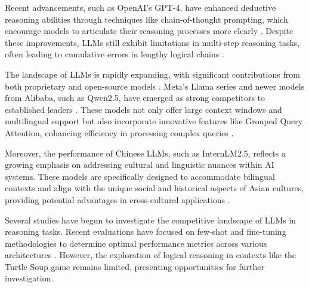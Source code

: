 \documentclass[conference]{IEEEtran}
\begin{document}
Recent advancements, such as OpenAI's GPT-4, have enhanced deductive reasoning abilities through techniques like chain-of-thought prompting, which encourage models to articulate their reasoning processes more clearly \cite{gou2024rationality}. Despite these improvements, LLMs still exhibit limitations in multi-step reasoning tasks, often leading to cumulative errors in lengthy logical chains \cite{tong2024can}.

The landscape of LLMs is rapidly expanding, with significant contributions from both proprietary and open-source models \cite{he2023survey}. Meta's Llama series and newer models from Alibaba, such as Qwen2.5, have emerged as strong competitors to established leaders \cite{hui2024qwen2, yang2024qwen2}. These models not only offer large context windows and multilingual support but also incorporate innovative features like Grouped Query Attention, enhancing efficiency in processing complex queries \cite{yang2024harnessing}.


Moreover, the performance of Chinese LLMs, such as InternLM2.5, reflects a growing emphasis on addressing cultural and linguistic nuances within AI systems. These models are specifically designed to accommodate bilingual contexts and align with the unique social and historical aspects of Asian cultures, providing potential advantages in cross-cultural applications \cite{zhang2024mme}.

Several studies have begun to investigate the competitive landscape of LLMs in reasoning tasks. Recent evaluations have focused on few-shot and fine-tuning methodologies to determine optimal performance metrics across various architectures \cite{winata2021language}. However, the exploration of logical reasoning in contexts like the Turtle Soup game remains limited, presenting opportunities for further investigation.
\end{document}
